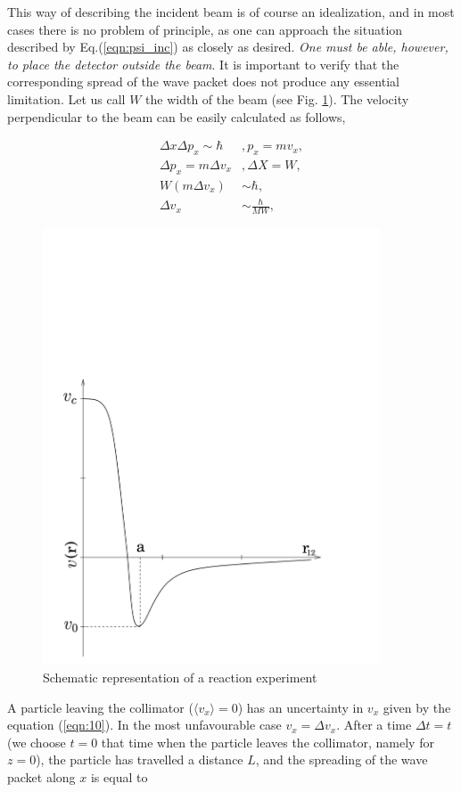 This way of describing the incident beam is of course an idealization, and in most cases there is no problem of principle, as one can approach the situation described by Eq.(\ref{eqn:psi_inc}) as closely as desired.
{\it One must be able, however, to place the detector outside the beam}. It is important to verify that the corresponding spread of the wave packet does not produce any essential limitation. Let us call $W$ the width of the beam (see Fig. \ref{fig1st_1}). The velocity perpendicular to the beam can be easily calculated as follows,

\begin{equation}
\begin{array}{rl}
\Delta x \Delta p_x \sim \hbar &, p_x = m v_x, \\
\Delta p_x = m \Delta v_x &, \Delta X = W, \\
W(m \Delta v_x) &\sim \hbar, \\
\Delta v_x &\sim \frac{\hbar}{MW},
\end{array}
\label{eqn:10}
\end{equation}
\begin{figure}
\centerline{\includegraphics*[width=10cm,angle=0]{C2/figs_C2/fig_1_1.pdf}}
\caption{Schematic representation of a reaction experiment}\label{fig1st_1}
\end{figure}

A particle leaving the collimator ($\langle v_x \rangle = 0$) has an uncertainty in $v_x$ given by the equation (\ref{eqn:10}). In the most unfavourable case $v_x = \Delta v_x$. After a time $\Delta t = t$ (we choose $t=0$ that time when the particle leaves the collimator, namely for $z=0$), the particle has travelled a distance $L$, and the spreading of the wave packet along $x$ is equal to

